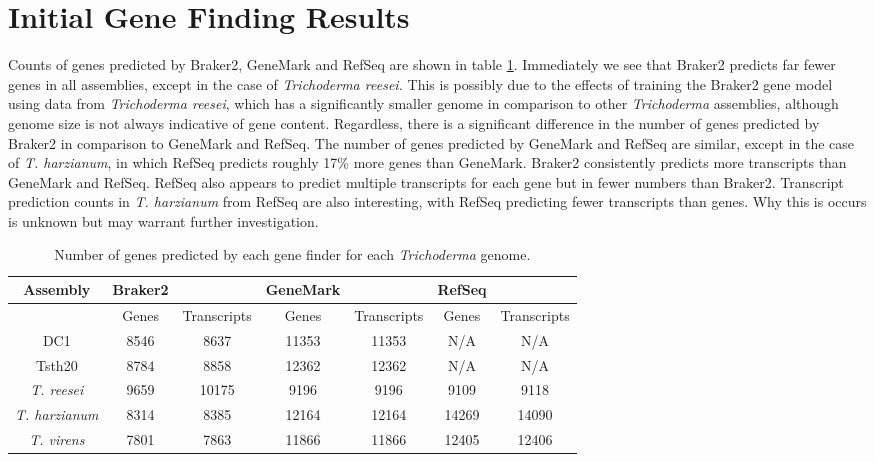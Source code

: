 \section{Initial Gene Finding Results} 

Counts of genes predicted by Braker2, GeneMark and RefSeq are shown in
table \ref{table:gene-counts}. Immediately we see that Braker2
predicts far fewer genes in all assemblies, except in the case of
\textit{Trichoderma reesei.} This is possibly due to the effects of
training the Braker2 gene model using data from \textit{Trichoderma
  reesei}, which has a significantly smaller genome in comparison to
other \textit{Trichoderma} assemblies, although genome size is not
always indicative of gene content. Regardless, there is a significant
difference in the number of genes predicted by Braker2 in comparison
to GeneMark and RefSeq. The number of genes predicted by GeneMark and
RefSeq are similar, except in the case of \textit{T. harzianum}, in
which RefSeq predicts roughly 17\% more genes than GeneMark. Braker2
consistently predicts more transcripts than GeneMark and
RefSeq. RefSeq also appears to predict multiple transcripts for each
gene but in fewer numbers than Braker2. Transcript prediction counts
in \textit{T. harzianum} from RefSeq are also interesting, with RefSeq
predicting fewer transcripts than genes. Why this is occurs is unknown
but may warrant further investigation.

\begin{table}
  \centering
  \begin{tabular}{|c|c|c|c|c|c|c|}
    \hline
    Assembly & Braker2 & & GeneMark & & RefSeq & \\ \hline
     & Genes & Transcripts & Genes & Transcripts & Genes & Transcripts \\ \hline
    DC1 & 8546 & 8637 & 11353 & 11353 & N/A & N/A \\ \hline
    Tsth20 & 8784 & 8858 & 12362 & 12362 & N/A & N/A \\ \hline
    \textit{T. reesei} & 9659 & 10175 & 9196 & 9196 & 9109 & 9118 \\ \hline
    \textit{T. harzianum} & 8314 & 8385 & 12164 & 12164 & 14269 & 14090 \\ \hline
    \textit{T. virens} & 7801 & 7863 & 11866 & 11866 & 12405 & 12406 \\ \hline
  \end{tabular}
  \caption[Gene prediction counts]{Number of genes predicted by each
    gene finder for each \textit{Trichoderma} genome.}
  \label{table:gene-counts}
\end{table}


